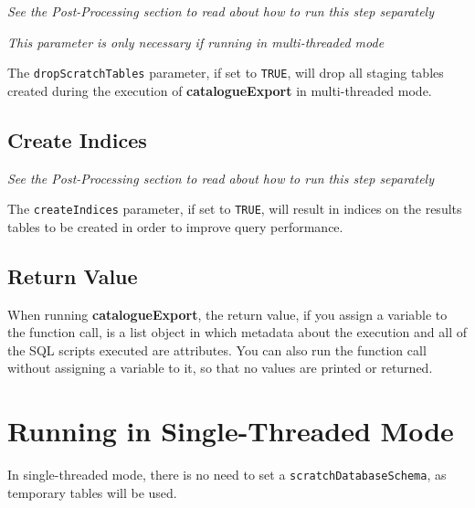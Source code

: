 \documentclass[
]{article}
\begin{document}
\emph{See the Post-Processing section to read about how to run this step
separately}

\emph{This parameter is only necessary if running in multi-threaded
mode}

The \texttt{dropScratchTables} parameter, if set to \texttt{TRUE}, will
drop all staging tables created during the execution of
\textbf{catalogueExport} in multi-threaded mode.

\hypertarget{create-indices}{%
\subsection{Create Indices}\label{create-indices}}

\emph{See the Post-Processing section to read about how to run this step
separately}

The \texttt{createIndices} parameter, if set to \texttt{TRUE}, will
result in indices on the results tables to be created in order to
improve query performance.

\hypertarget{return-value}{%
\subsection{Return Value}\label{return-value}}

When running \textbf{catalogueExport}, the return value, if you assign a
variable to the function call, is a list object in which metadata about
the execution and all of the SQL scripts executed are attributes. You
can also run the function call without assigning a variable to it, so
that no values are printed or returned.

\hypertarget{running-in-single-threaded-mode}{%
\section{Running in Single-Threaded
Mode}\label{running-in-single-threaded-mode}}

In single-threaded mode, there is no need to set a
\texttt{scratchDatabaseSchema}, as temporary tables will be used.
\end{document}
